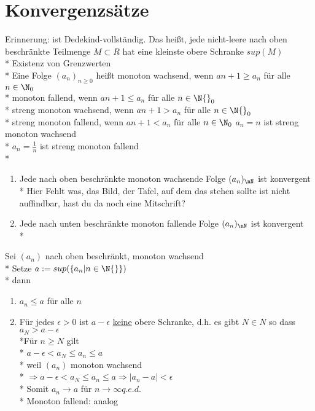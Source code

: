 \chapter{Konvergenzsätze}
Erinnerung: \R{} ist Dedekind-vollständig. Das heißt, jede nicht-leere nach oben beschränkte Teilmenge $M \subset R$ hat eine kleinste obere Schranke $sup(M)$\\*
\phantom{XXX}\Rarr{} Existenz von Grenzwerten\\*
Eine Folge $(a_n)_{n \geq 0}$ heißt monoton wachsend, wenn $a{n + 1} \geq a_n$ für alle $n \in \N_0$\\*
monoton fallend, wenn $a{n + 1} \leq a_n$ für alle $n \in \N{}_0$\\*
streng monoton wachsend, wenn $a{n + 1} > a_n$ für alle $n \in \N{}_0$\\*
streng monoton fallend, wenn $a{n + 1} < a_n$ für alle $n \in \N_0$
\bsp
$a_n = n$ ist streng monoton wachsend\\*
$a_n = \frac{1}{n}$ ist streng monoton fallend\\*
\begin{enumerate}
\item{Jede nach oben beschränkte monoton wachsende Folge $(a_n)_{\nN}$ ist konvergent\\*
Hier Fehlt was, das Bild, der Tafel, auf dem das stehen sollte ist nicht auffindbar, hast du da noch eine Mitschrift?
}
\item{Jede nach unten beschränkte monoton fallende Folge $(a_n)_\nN$ ist konvergent\\*
}
\end{enumerate}
\bew
Sei $(a_n)$ nach oben beschränkt, monoton wachsend\\*
Setze $a:= sup(\{a_n | n \in \N{}\})$\\*
dann \begin{enumerate}
\item{$a_n \leq a$ für alle $n$}
\item{Für jedes $\epsilon > 0$ ist $a - \epsilon$ \ul{keine} obere Schranke, d.h. es gibt $N \in N$ so dass $a_N > a - \epsilon$
\\*Für $n \geq N$ gilt\\*
$a - \epsilon < a_N \leq a_n \leq a$\\*
weil $(a_n)$ monoton wachsend\\*
$\Rightarrow a - \epsilon < a_N \leq a_n \leq a \Rightarrow |a_n -a| < \epsilon$\\*
Somit $a_n \to a$ für $n \to \infty$\phantom{XXX}$q.e.d.$\\*
Monoton fallend: analog}
\end{enumerate}
